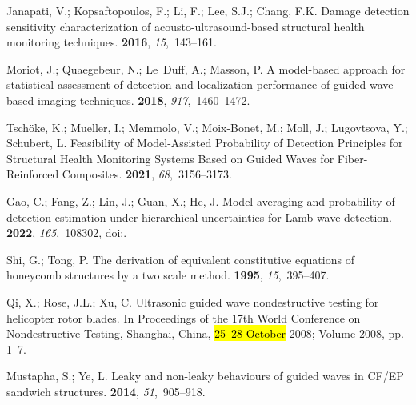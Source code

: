 \documentclass[sensors,article,accept,moreauthors,pdftex]{Definitions/mdpi}
\begin{document}
\begin{thebibliography}{999}
Janapati, V.; Kopsaftopoulos, F.; Li, F.; Lee, S.J.; Chang, F.K.
\newblock Damage detection sensitivity characterization of
  acousto-ultrasound-based structural health monitoring techniques.
 {\bf 2016}, {\em 15},~143--161.

Moriot, J.; Quaegebeur, N.; Le~Duff, A.; Masson, P.
\newblock A model-based approach for statistical assessment of detection and
  localization performance of guided wave–based imaging techniques.
 {\bf 2018}, {\em 917},~1460--1472.

Tsch\"oke, K.; Mueller, I.; Memmolo, V.; Moix-Bonet, M.; Moll, J.; Lugovtsova,
  Y.; Schubert, L.
\newblock Feasibility of Model-Assisted Probability of Detection Principles for
  Structural Health Monitoring Systems Based on Guided Waves for
  Fiber-Reinforced Composites.
 {\bf 2021}, {\em
  68},~3156--3173.

Gao, C.; Fang, Z.; Lin, J.; Guan, X.; He, J.
\newblock Model averaging and probability of detection estimation under
  hierarchical uncertainties for Lamb wave detection.
 {\bf 2022}, {\em 165},~108302,
\newblock
  doi:{\href{https://doi.org/10.1016/j.ymssp.2021.108302}{}}.

Shi, G.; Tong, P.
\newblock The derivation of equivalent constitutive equations of honeycomb
  structures by a two scale method.
 {\bf 1995}, {\em 15},~395--407.

Qi, X.; Rose, J.L.; Xu, C.
\newblock Ultrasonic guided wave nondestructive testing for helicopter rotor
  blades.
\newblock  In Proceedings of the 17th World Conference on Nondestructive Testing, Shanghai, China, 
\hl{25--28 October} 2008; Volume 2008, pp. 1--7.%

Mustapha, S.; Ye, L.
\newblock Leaky and non-leaky behaviours of guided waves in CF/EP sandwich
  structures.
 {\bf 2014}, {\em 51},~905--918.


\end{thebibliography}
\end{document}
